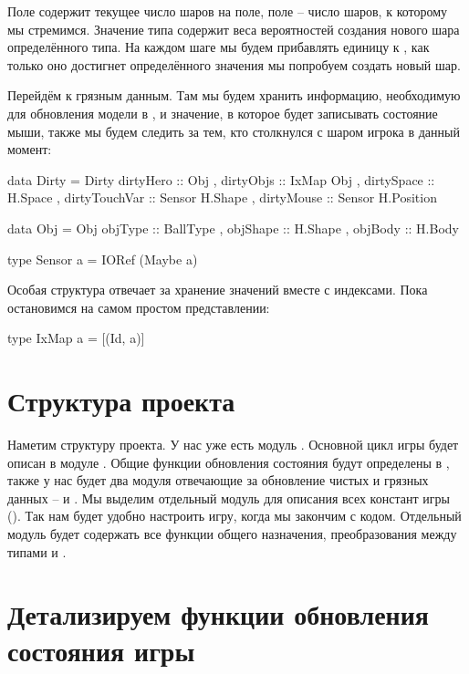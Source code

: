 Поле  содержит текущее число шаров на поле, поле
 -- число шаров, к которому мы стремимся. Значение
типа  содержит веса вероятностей создания нового шара
определённого типа. На каждом шаге мы будем прибавлять единицу к
, как только оно достигнет определённого значения мы
попробуем создать новый шар.

Перейдём к грязным данным. Там мы будем хранить информацию, необходимую
для обновления модели в , и значение, в которое 
будет записывать состояние мыши, также мы будем следить за тем, кто
столкнулся с шаром игрока в данный момент:


\begin{code}
data Dirty = Dirty 
    { dirtyHero     :: Obj
    , dirtyObjs     :: IxMap Obj
    , dirtySpace    :: H.Space
    , dirtyTouchVar :: Sensor H.Shape
    , dirtyMouse    :: Sensor H.Position
    }

data Obj = Obj 
    { objType     :: BallType
    , objShape    :: H.Shape
    , objBody     :: H.Body
    } 

type Sensor a = IORef (Maybe a)
\end{code}

Особая структура  отвечает за хранение значений вместе с
индексами. Пока остановимся на самом простом представлении:


\begin{code}
type IxMap a = [(Id, a)]
\end{code}

\section{Структура проекта}

Наметим структуру проекта. У нас уже есть модуль . Основной
цикл игры будет описан в модуле . Общие функции обновления
состояния будут определены в , также у нас будет два модуля
отвечающие за обновление чистых и грязных данных --  и
. Мы выделим отдельный модуль для описания всех констант
игры (). Так нам будет удобно настроить игру, когда мы
закончим с кодом. Отдельный модуль  будет содержать все
функции общего назначения, преобразования между типами  и
.

\section{Детализируем функции обновления состояния игры}

